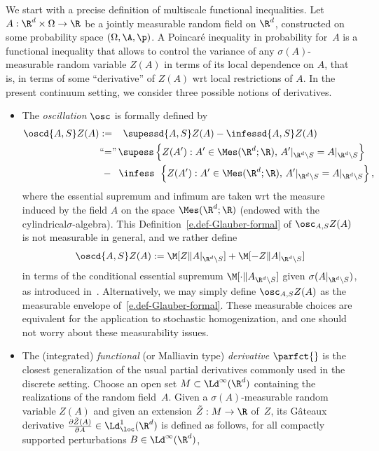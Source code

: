 We start with a precise definition of multiscale functional inequalities. Let\linebreak$A:\R^d\times\Omega\to\R$ be a jointly measurable random field on $\R^d$, constructed on some probability space $(\Omega,\A,\p)$. A Poincaré inequality in probability for~$A$ is a functional inequality that allows to control the variance of any $\sigma(A)$-measurable random variable $Z(A)$ in terms of its local dependence on $A$, that is, in terms of some ``derivative'' of $Z(A)$ wrt local restrictions of $A$. In the present continuum setting, we consider three possible notions of derivatives.
\begin{itemize}
\item The \emph{oscillation} $\osc$ is formally defined by
\begin{equation}\label{e.def-Glauber-formal}
\begin{aligned}
\oscd{A,S}Z(A)&:=\;\;\;\supessd{A,S}Z(A)-\infessd{A,S}Z(A)\\
&\mkern1mu\text{``$=$''}\,\supess\left\{Z(A'):A'\in\Mes(\R^d;\R),\,A'|_{\R^d\setminus S}=A|_{\R^d\setminus S}\right\} \\
&\:-\;\;\infess\;\,\left\{Z(A'):A'\in\Mes(\R^d;\R),\,A'|_{\R^d\setminus S}=A|_{\R^d\setminus S}\right\},
\end{aligned}
\end{equation}
where the essential supremum and infimum are taken wrt the measure induced by the field $A$ on the space $\Mes(\R^d;\R)$ (endowed with the cylindrical\linebreak$\sigma$-algebra). This Definition~\eqref{e.def-Glauber-formal} of $\osc_{A,S}Z(A)$ is not measurable in general, and we rather define
\[
\oscd{A,S}Z(A):=\M[Z\|A|_{\R^d\setminus S}]+\M[-Z\|A|_{\R^d\setminus S}]
\]
in terms of the conditional essential supremum $\M[\cdot\|A_{\R^d\setminus S}]$ given $\sigma(A|_{\R^d\setminus S})$, as introduced in~\cite{Barron}. Alternatively, we may simply define $\osc_{A,S}Z(A)$ as the measurable envelope of~\eqref{e.def-Glauber-formal}. These measurable choices are equivalent for the application to stochastic homogenization, and one should not worry about these measurability issues.
\item The (integrated) \emph{functional} (or Malliavin type) \emph{derivative} $\parfct{}$ is the closest generalization of the usual partial derivatives commonly used in the discrete setting. Choose an open set $M\subset \Ld^\infty(\R^d)$ containing the realizations of the random field~$A$. Given a $\sigma(A)$-measurable random variable $Z(A)$ and given an extension $\tilde Z:M\to\R$ of~$Z$, its G\^ateaux derivative $\frac{\partial\tilde Z(A)}{\partial A}\in\Ld^1_{\loc}(\R^d)$ is defined as follows, for all compactly supported perturbations $B\in\Ld^\infty(\R^d)$,

\end{itemize}
